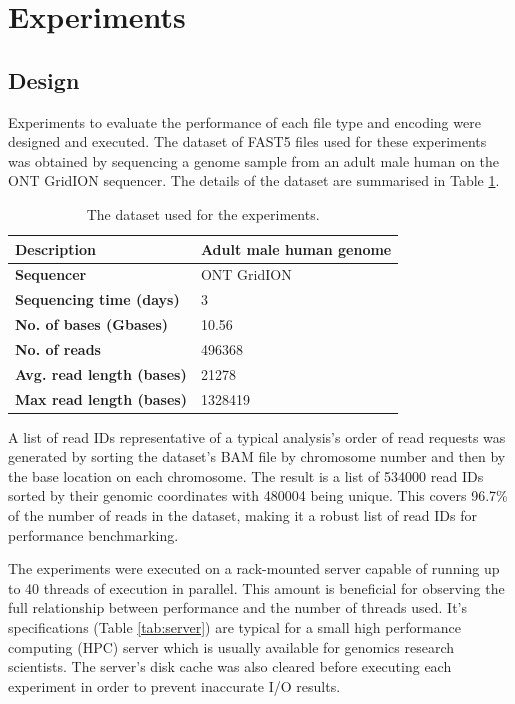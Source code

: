 \section{Experiments}
\label{sec:experi}

\subsection{Design}
\label{sec:experi:design}

Experiments to evaluate the performance of each file type and encoding were designed and executed. The dataset of FAST5 files used for these experiments was obtained by sequencing a genome sample from an adult male human on the ONT GridION sequencer. The details of the dataset are summarised in Table \ref{tab:data}.

\begin{table}[h!]
    \caption{The dataset used for the experiments.\label{tab:data}}
    \begin{tabular}{|l|l|}
        \hline
        \textbf{Description} & Adult male human genome \\
        \hline
        \textbf{Sequencer} & ONT GridION \\
        \textbf{Sequencing time (days)} & 3 \\
        \hline
        \textbf{No.\nomenclature{No.}{Number} of bases (Gbases\nomenclature{Gbases}{Gigabases})} & 10.56 \\
        \textbf{No. of reads} & \num{496368} \\
        \textbf{Avg.\nomenclature{Avg.}{Average} read length (bases)} & \num{21278} \\
        \textbf{Max read length (bases)} & \num{1328419} \\
        \hline
    \end{tabular}
\end{table}

A list of read IDs representative of a typical analysis's order of read requests was generated by sorting the dataset's BAM file \cite{sam:file} by chromosome number and then by the base location on each chromosome. The result is a list of \num{534000} read IDs sorted by their genomic coordinates with \num{480004} being unique. This covers 96.7\% of the number of reads in the dataset, making it a robust list of read IDs for performance benchmarking.

The experiments were executed on a rack-mounted server capable of running up to 40 threads of execution in parallel. This amount is beneficial for observing the full relationship between performance and the number of threads used. It's specifications (Table \ref{tab:server}) are typical for a small high performance computing (HPC) server which is usually available for genomics research scientists. The server's disk cache was also cleared before executing each experiment in order to prevent inaccurate I/O results.

